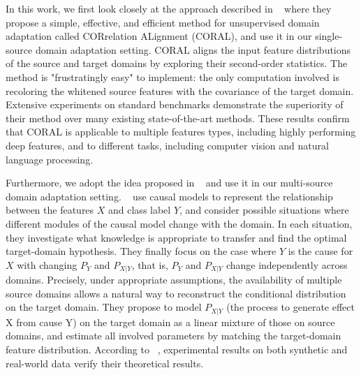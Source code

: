 In this work, we first look closely at the approach described in ~\citep{coral} where they propose a simple, effective, and efficient method for unsupervised domain adaptation called CORrelation ALignment (CORAL), and use it in our single-source domain adaptation setting. CORAL aligns the input feature distributions of the source and target domains by exploring their second-order statistics. The method is "frustratingly easy" to implement: the only computation involved is recoloring the whitened source features with the covariance of the target domain. Extensive experiments on standard benchmarks demonstrate the superiority of their method over many existing state-of-the-art methods. These results confirm that CORAL is applicable to multiple features types, including highly performing deep features, and to different tasks, including computer vision and natural language processing.

Furthermore, we adopt the idea proposed in ~\citep{mda} and use it in our multi-source domain adaptation setting. ~\citet{mda} use causal models to represent the relationship between the features $X$ and class label $Y$, and consider possible situations where different modules of the causal model change with the domain. In each situation, they investigate what knowledge is appropriate to transfer and find the optimal target-domain hypothesis. They finally focus on the case where $Y$ is the cause for $X$ with changing $P_Y$ and $P_{X|Y}$, that is, $P_Y$ and $P_{X|Y}$ change independently across domains. Precisely, under appropriate assumptions, the availability of multiple source domains allows a natural way to reconstruct the conditional distribution on the target domain. They propose to model $P_{X|Y}$ (the process to generate effect X from cause Y) on the target domain as a linear mixture of those on source domains, and estimate all involved parameters by matching the target-domain feature distribution. According to ~\citep{mda}, experimental results on both synthetic and real-world data verify their theoretical results.












